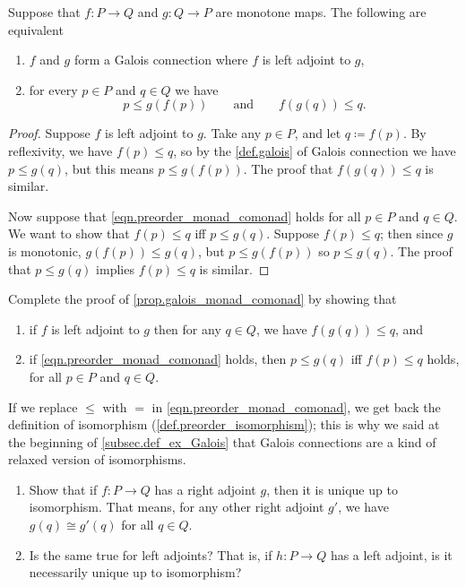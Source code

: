 \documentclass[7Sketches]{subfiles}
\begin{document}
\begin{proposition}%
\label{prop.galois_monad_comonad}%
Suppose that $f\colon P\to Q$ and $g\colon Q\to P$ are monotone maps. The following are equivalent
\begin{enumerate}[label=(\alph*)]
	\item $f$ and $g$ form a Galois connection where $f$ is left adjoint to $g$,
	\item for every $p\in P$ and $q\in Q$ we have
  \begin{equation}%
\label{eqn.preorder_monad_comonad}
  	p\leq g(f(p))
  	\qquad\text{and}\qquad
  	f(g(q))\leq q.
  \end{equation}
\end{enumerate}
\end{proposition}
\begin{proof}
Suppose $f$ is left adjoint to $g$. Take any $p\in P$, and let $q\coloneqq
f(p)$. By reflexivity, we have $f(p)\leq q$, so by the \cref{def.galois} of
Galois connection we have $p\leq g(q)$, but this means $p\leq g(f(p))$. The
proof that $f(g(q))\leq q$ is similar.

Now suppose that \cref{eqn.preorder_monad_comonad} holds for all $p\in P$ and $q\in Q$. We want to show that $f(p)\leq q$ iff $p\leq g(q)$. Suppose $f(p)\leq q$; then since $g$ is monotonic, $g(f(p))\leq g(q)$, but $p\leq g(f(p))$ so $p\leq g(q)$. The proof that $p\leq g(q)$ implies $f(p)\leq q$ is similar.
\end{proof}

\begin{exercise}%
\label{exc.proof_galois_monad}
Complete the proof of \cref{prop.galois_monad_comonad} by showing that
\begin{enumerate}
	\item if $f$ is left adjoint to $g$ then for any $q\in Q$, we have $f(g(q))\leq q$, and 
	\item if \cref{eqn.preorder_monad_comonad} holds, then $p\leq g(q)$ iff $f(p)\leq q$ holds, for all $p\in P$ and $q\in Q$.
\qedhere
\end{enumerate}
\end{exercise}


If we replace $\leq$ with $=$ in \cref{eqn.preorder_monad_comonad}, we get back the definition of isomorphism (\cref{def.preorder_isomorphism}); this is why we said at the beginning of \cref{subsec.def_ex_Galois} that Galois connections are a kind of relaxed version of isomorphisms.

\begin{exercise}%
\label{exc.uniqueness_of_adjoints}
 	\begin{enumerate}
		\item Show that if $f\colon P\to Q$ has a right adjoint $g$, then it is unique up to isomorphism. That means, for any other right adjoint $g'$, we have $g(q)\cong g'(q)$ for all $q\in Q$.
  	\item Is the same true for left adjoints? That is, if $h\colon P\to Q$ has a left adjoint, is it necessarily unique up to isomorphism?
	\qedhere
	\end{enumerate}
\end{exercise}
\end{document}
